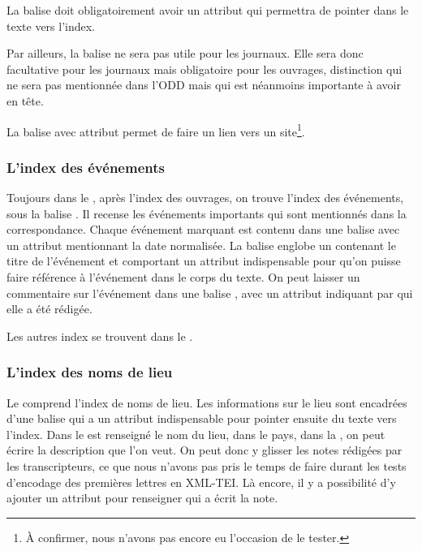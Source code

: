 La balise  doit obligatoirement avoir un attribut  qui permettra de pointer dans le texte vers l'index.

Par ailleurs, la balise  ne sera pas utile pour les journaux. Elle sera donc facultative pour les journaux mais obligatoire pour les ouvrages, distinction qui ne sera pas mentionnée dans l'ODD mais qui est néanmoins importante à avoir en tête.

La balise  avec attribut  permet de faire un lien vers un site\footnote{À confirmer, nous n'avons pas encore eu l'occasion de le tester.}. 

\subsubsection{L'index des événements}

Toujours dans le , après l'index des ouvrages, on trouve l'index des événements, sous la balise . Il recense les événements importants qui sont mentionnés dans la correspondance. Chaque événement marquant est contenu dans une balise  avec un attribut  mentionnant la date normalisée. La balise  englobe un  contenant le titre de l'événement et comportant un attribut  indispensable pour qu'on puisse faire référence à l'événement dans le corps du texte. On peut laisser un commentaire sur l'événement dans une balise , avec un attribut  indiquant par qui elle a été rédigée.

Les autres index se trouvent dans le .

\subsubsection{L'index des noms de lieu}
Le  comprend l'index de noms de lieu.
Les informations sur le lieu sont encadrées d'une balise  qui a un attribut  indispensable pour pointer ensuite du texte vers l'index. Dans le  est renseigné le nom du lieu, dans  le pays, dans la , on peut écrire la description que l'on veut. On peut donc y glisser les notes rédigées par les transcripteurs, ce que nous n'avons pas pris le temps de faire durant les tests d'encodage des premières lettres en XML-TEI. Là encore, il y a possibilité d'y ajouter un attribut  pour renseigner qui a écrit la note.


